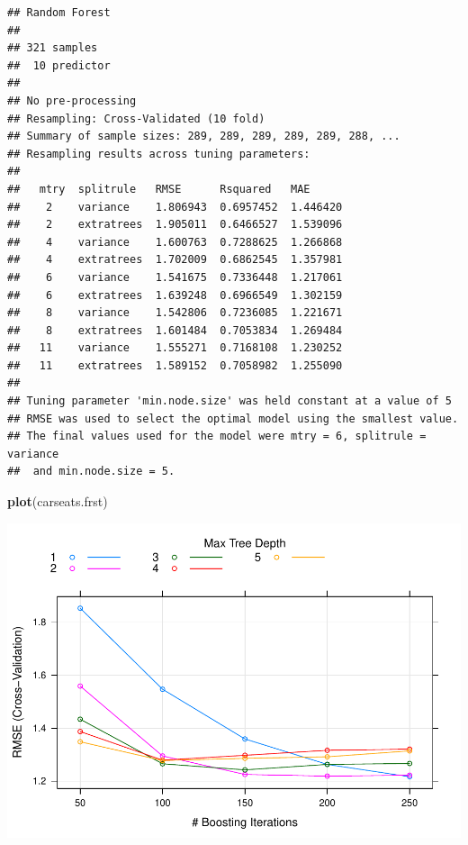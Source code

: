\documentclass[
]{book}
\newenvironment{Shaded}{\begin{snugshade}}{\end{snugshade}}
\newcommand{\DataTypeTok}[1]{\textcolor[rgb]{0.13,0.29,0.53}{#1}}
\newcommand{\DecValTok}[1]{\textcolor[rgb]{0.00,0.00,0.81}{#1}}
\newcommand{\KeywordTok}[1]{\textcolor[rgb]{0.13,0.29,0.53}{\textbf{#1}}}
\newcommand{\NormalTok}[1]{#1}
\newcommand{\OperatorTok}[1]{\textcolor[rgb]{0.81,0.36,0.00}{\textbf{#1}}}
\newcommand{\StringTok}[1]{\textcolor[rgb]{0.31,0.60,0.02}{#1}}
\begin{document}
\begin{verbatim}
## Random Forest 
## 
## 321 samples
##  10 predictor
## 
## No pre-processing
## Resampling: Cross-Validated (10 fold) 
## Summary of sample sizes: 289, 289, 289, 289, 289, 288, ... 
## Resampling results across tuning parameters:
## 
##   mtry  splitrule   RMSE      Rsquared   MAE     
##    2    variance    1.806943  0.6957452  1.446420
##    2    extratrees  1.905011  0.6466527  1.539096
##    4    variance    1.600763  0.7288625  1.266868
##    4    extratrees  1.702009  0.6862545  1.357981
##    6    variance    1.541675  0.7336448  1.217061
##    6    extratrees  1.639248  0.6966549  1.302159
##    8    variance    1.542806  0.7236085  1.221671
##    8    extratrees  1.601484  0.7053834  1.269484
##   11    variance    1.555271  0.7168108  1.230252
##   11    extratrees  1.589152  0.7058982  1.255090
## 
## Tuning parameter 'min.node.size' was held constant at a value of 5
## RMSE was used to select the optimal model using the smallest value.
## The final values used for the model were mtry = 6, splitrule = variance
##  and min.node.size = 5.
\end{verbatim}

\begin{Shaded}
\begin{Highlighting}[]
\KeywordTok{plot}\NormalTok{(carseats.frst)}
\end{Highlighting}
\end{Shaded}

\includegraphics{data-sci_files/figure-latex/unnamed-chunk-87-1.pdf}

\begin{Shaded}
\end{Shaded}
\end{document}
